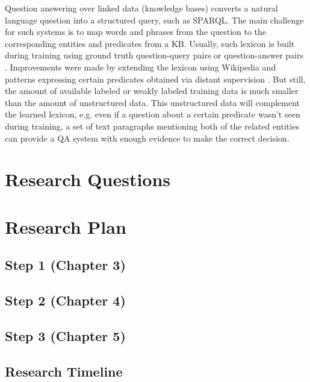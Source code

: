 Question answering over linked data (knowledge bases) converts a natural language question into a structured query, such as SPARQL.
The main challenge for such systems is to map words and phrases from the question to the corresponding entities and predicates from a KB.
Usually, such lexicon is built during training using ground truth question-query pairs \cite{CaiY13} or question-answer pairs \cite{BerantCFL13:sempre}.
Improvements were made by extending the lexicon using Wikipedia and patterns expressing certain predicates obtained via distant supervision \cite{bastmore:cikm:2015:aquu,BordesCW14:emnlp,ReddyLS14,yih:ACL:2015:STAGG,YaoD14}.
But still, the amount of available labeled or weakly labeled training data is much smaller than the amount of unstructured data.
This unstructured data will complement the learned lexicon, e.g. even if a question about a certain predicate wasn't seen during training, a set of text paragraphs mentioning both of the related entities can provide a QA system with enough evidence to make the correct decision.


\section{Research Questions}


\section{Research Plan}

\subsection{Step 1 (Chapter 3)}
\label{sec:plan1}

\subsection{Step 2 (Chapter 4)}
\label{sec:plan2}

\subsection{Step 3 (Chapter 5)}
\label{sec:plan3}

\subsection{Research Timeline}



